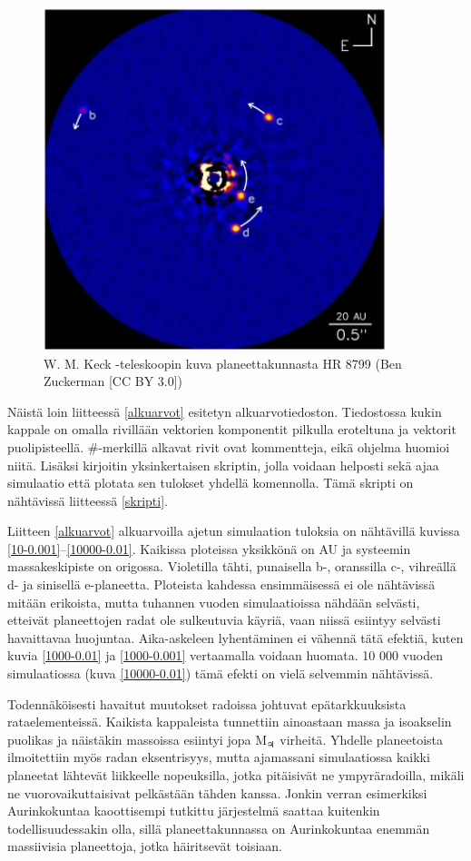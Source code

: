 \documentclass[12pt,a4paper,titlepage]{article}
\begin{document}
\begin{figure}
\centering
\includegraphics[width=10cm]{directimage.jpg}
\caption{W. M. Keck -teleskoopin kuva planeettakunnasta HR 8799 (Ben Zuckerman [CC BY 3.0])}
\label{directimage}
\end{figure}

Näistä loin liitteessä \ref{alkuarvot} esitetyn alkuarvotiedoston. Tiedostossa kukin kappale on omalla rivillään vektorien komponentit pilkulla eroteltuna ja vektorit puolipisteellä. \#-merkillä alkavat rivit ovat kommentteja, eikä ohjelma huomioi niitä. Lisäksi kirjoitin yksinkertaisen skriptin, jolla voidaan helposti sekä ajaa simulaatio että plotata sen tulokset yhdellä komennolla. Tämä skripti on nähtävissä liitteessä \ref{skripti}.

Liitteen \ref{alkuarvot} alkuarvoilla ajetun simulaation tuloksia on nähtävillä kuvissa \ref{10-0.001}--\ref{10000-0.01}. Kaikissa ploteissa yksikkönä on AU ja systeemin massakeskipiste on origossa. Violetilla tähti, punaisella b-, oranssilla c-, vihreällä d- ja sinisellä e-planeetta. Ploteista kahdessa ensimmäisessä ei ole nähtävissä mitään erikoista, mutta tuhannen vuoden simulaatioissa nähdään selvästi, etteivät planeettojen radat ole sulkeutuvia käyriä, vaan niissä esiintyy selvästi havaittavaa huojuntaa. Aika-askeleen lyhentäminen ei vähennä tätä efektiä, kuten kuvia \ref{1000-0.01} ja \ref{1000-0.001} vertaamalla voidaan huomata. 10 000 vuoden simulaatiossa (kuva \ref{10000-0.01}) tämä efekti on vielä selvemmin nähtävissä.

Todennäköisesti havaitut muutokset radoissa johtuvat epätarkkuuksista rataelementeissä. Kaikista kappaleista tunnettiin ainoastaan massa ja isoakselin puolikas ja näistäkin massoissa esiintyi jopa $\text{M}_{\jupiter}$ virheitä. Yhdelle planeetoista ilmoitettiin myös radan eksentrisyys, mutta ajamassani simulaatiossa kaikki planeetat lähtevät liikkeelle nopeuksilla, jotka pitäisivät ne ympyräradoilla, mikäli ne vuorovaikuttaisivat pelkästään tähden kanssa. Jonkin verran esimerkiksi Aurinkokuntaa kaoottisempi tutkittu järjestelmä saattaa kuitenkin todellisuudessakin olla, sillä planeettakunnassa on Aurinkokuntaa enemmän massiivisia planeettoja, jotka häiritsevät toisiaan.
\end{document}
